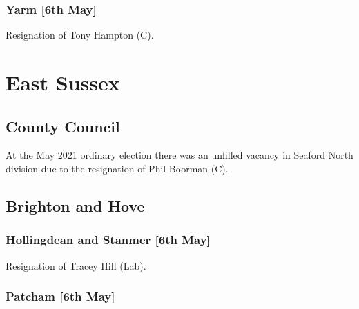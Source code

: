 \documentclass[a4paper,openany]{book}
\begin{document}
\begin{resultsiii}

\subsubsection*{Yarm \hspace*{\fill}\nolinebreak[1]%
	\enspace\hspace*{\fill}
	[6th May]}


Resignation of Tony Hampton (C).

\section{East Sussex}

\subsection*{County Council}

At the May 2021 ordinary election there was an unfilled vacancy in Seaford North division due to the resignation of Phil Boorman (C).

\subsection*{Brighton and Hove}

\subsubsection*{Hollingdean and Stanmer \hspace*{\fill}\nolinebreak[1]%
	\enspace\hspace*{\fill}
	[6th May]}


Resignation of Tracey Hill (Lab).

\subsubsection*{Patcham \hspace*{\fill}\nolinebreak[1]%
	\enspace\hspace*{\fill}
	[6th May]}


\end{resultsiii}
\end{document}
